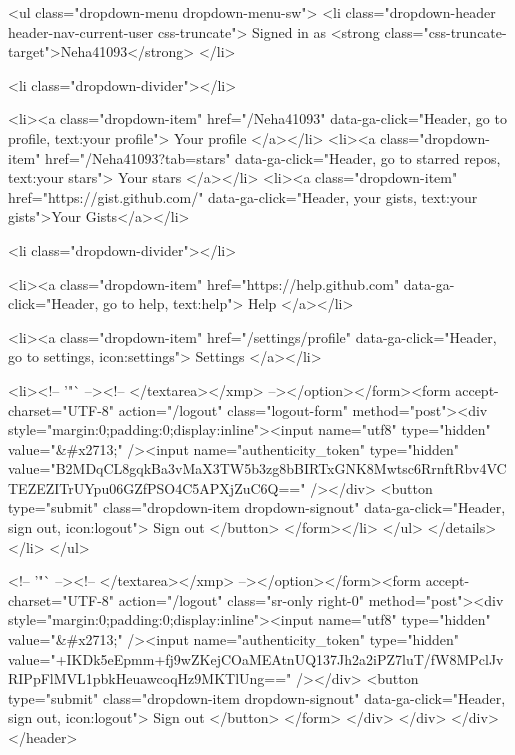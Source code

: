       <ul class="dropdown-menu dropdown-menu-sw">
        <li class="dropdown-header header-nav-current-user css-truncate">
          Signed in as <strong class="css-truncate-target">Neha41093</strong>
        </li>

        <li class="dropdown-divider"></li>

        <li><a class="dropdown-item" href="/Neha41093" data-ga-click="Header, go to profile, text:your profile">
          Your profile
        </a></li>
        <li><a class="dropdown-item" href="/Neha41093?tab=stars" data-ga-click="Header, go to starred repos, text:your stars">
          Your stars
        </a></li>
          <li><a class="dropdown-item" href="https://gist.github.com/" data-ga-click="Header, your gists, text:your gists">Your Gists</a></li>

        <li class="dropdown-divider"></li>

        <li><a class="dropdown-item" href="https://help.github.com" data-ga-click="Header, go to help, text:help">
          Help
        </a></li>

        <li><a class="dropdown-item" href="/settings/profile" data-ga-click="Header, go to settings, icon:settings">
          Settings
        </a></li>

        <li><!-- '"` --><!-- </textarea></xmp> --></option></form><form accept-charset="UTF-8" action="/logout" class="logout-form" method="post"><div style="margin:0;padding:0;display:inline"><input name="utf8" type="hidden" value="&#x2713;" /><input name="authenticity_token" type="hidden" value="B2MDqCL8gqkBa3vMaX3TW5b3zg8bBIRTxGNK8Mwtsc6RrnftRbv4VCTEZEZITrUYpu06GZfPSO4C5APXjZuC6Q==" /></div>
          <button type="submit" class="dropdown-item dropdown-signout" data-ga-click="Header, sign out, icon:logout">
            Sign out
          </button>
        </form></li>
      </ul>
    </details>
  </li>
</ul>


        <!-- '"` --><!-- </textarea></xmp> --></option></form><form accept-charset="UTF-8" action="/logout" class="sr-only right-0" method="post"><div style="margin:0;padding:0;display:inline"><input name="utf8" type="hidden" value="&#x2713;" /><input name="authenticity_token" type="hidden" value="+IKDk5eEpmm+fj9wZKejCOaMEAtnUQ137Jh2a2iPZ7luT/fW8MPclJvRIPpFlMVL1pbkHeuawcoqHz9MKTlUng==" /></div>
          <button type="submit" class="dropdown-item dropdown-signout" data-ga-click="Header, sign out, icon:logout">
            Sign out
          </button>
</form>      </div>
    </div>
  </div>
</header>


